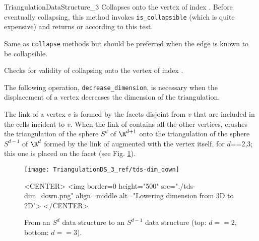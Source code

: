 \begin{ccRefConcept}{TriangulationDataStructure_3}
{Collapses  onto the vertex of index . Before eventually collapsing, this method invokes \texttt{is\_collapsible} (which is quite expensive) and returns  or  according to this test.
}

{Same as \texttt{collapse} methods but should be preferred when the edge is known to be collapsible.
}

{Checks for validity of collapsing  onto the vertex of index . 
}

\newpage


The following operation, \texttt{decrease\_dimension}, is necessary when the displacement of a vertex decreases
the dimension of the triangulation.

{The link of a vertex $v$ is formed by the  facets
disjoint from $v$ that are included in the cells incident to $v$. When the link of  contains all the other vertices,  crushes the 
triangulation of the sphere $S^d$ of $\R^{d+1}$ onto the 
triangulation of the sphere $S^{d-1}$ of $\R^{d}$ formed by the link of 
augmented with the vertex  itself, for $d$==2,3; this one is placed on the facet 
(see Fig. \ref{TDS3-dim_down}).
}

\begin{figure}
\begin{ccTexOnly}
\begin{center}
\texttt{[image: TriangulationDS\_3\_ref/tds-dim\_down]}
\end{center}
\end{ccTexOnly} 
\caption{From an $S^d$ data structure to an $S^{d-1}$ data structure (top: $d==2$, bottom: $d==3$).\label{TDS3-dim_down}}
\begin{ccHtmlOnly}
<CENTER>
<img border=0 height="500" src="./tds-dim_down.png" align=middle alt="Lowering dimension from 3D to 2D">
</CENTER>
\end{ccHtmlOnly} 
\end{figure}


\end{ccRefConcept}
